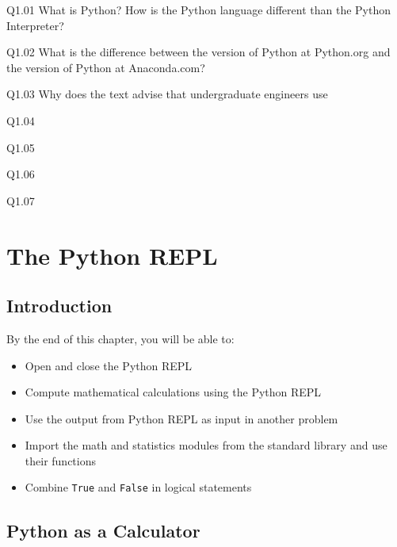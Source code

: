 \documentclass{book}
\newenvironment{problems}{\begin{multicols}{2}}{\end{multicols}} %
\begin{document}
    
        \begin{problems}
        Q1.01 What is Python? How is the Python language different than the
Python Interpreter?

Q1.02 What is the difference between the version of Python at Python.org
and the version of Python at Anaconda.com?

Q1.03 Why does the text advise that undergraduate engineers use

Q1.04

Q1.05

Q1.06

Q1.07
        \end{problems}

    




    
        \chapter{The Python REPL}\label{the-python-repl}
    




    
        \section{Introduction}\label{introduction}
    




    
        By the end of this chapter, you will be able to:

\begin{itemize}
\item
  Open and close the Python REPL
\item
  Compute mathematical calculations using the Python REPL
\item
  Use the output from Python REPL as input in another problem
\item
  Import the math and statistics modules from the standard library and
  use their functions
\item
  Combine \lstinline!True! and \lstinline!False! in logical statements
\end{itemize}
    




    
        \section{Python as a Calculator}\label{python-as-a-calculator}
    
\end{document}
